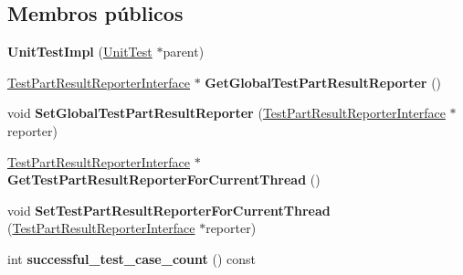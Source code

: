 \subsection*{Membros públicos}
\begin{DoxyCompactItemize}
\item 
\hypertarget{classtesting_1_1internal_1_1UnitTestImpl_a5fb75faa88ee71f26e16473455b70839}{{\bfseries Unit\-Test\-Impl} (\hyperlink{classtesting_1_1UnitTest}{Unit\-Test} $\ast$parent)}\label{classtesting_1_1internal_1_1UnitTestImpl_a5fb75faa88ee71f26e16473455b70839}

\item 
\hypertarget{classtesting_1_1internal_1_1UnitTestImpl_a1cd291fd6751654924362164735d4b49}{\hyperlink{classtesting_1_1TestPartResultReporterInterface}{Test\-Part\-Result\-Reporter\-Interface} $\ast$ {\bfseries Get\-Global\-Test\-Part\-Result\-Reporter} ()}\label{classtesting_1_1internal_1_1UnitTestImpl_a1cd291fd6751654924362164735d4b49}

\item 
\hypertarget{classtesting_1_1internal_1_1UnitTestImpl_a892b0e25b28af5e4400cf6fac336f2d8}{void {\bfseries Set\-Global\-Test\-Part\-Result\-Reporter} (\hyperlink{classtesting_1_1TestPartResultReporterInterface}{Test\-Part\-Result\-Reporter\-Interface} $\ast$reporter)}\label{classtesting_1_1internal_1_1UnitTestImpl_a892b0e25b28af5e4400cf6fac336f2d8}

\item 
\hypertarget{classtesting_1_1internal_1_1UnitTestImpl_a5fb3dd8bc839e10b62eba07790704132}{\hyperlink{classtesting_1_1TestPartResultReporterInterface}{Test\-Part\-Result\-Reporter\-Interface} $\ast$ {\bfseries Get\-Test\-Part\-Result\-Reporter\-For\-Current\-Thread} ()}\label{classtesting_1_1internal_1_1UnitTestImpl_a5fb3dd8bc839e10b62eba07790704132}

\item 
\hypertarget{classtesting_1_1internal_1_1UnitTestImpl_a1403fc10aebcc64479c5ee980c9b4eb4}{void {\bfseries Set\-Test\-Part\-Result\-Reporter\-For\-Current\-Thread} (\hyperlink{classtesting_1_1TestPartResultReporterInterface}{Test\-Part\-Result\-Reporter\-Interface} $\ast$reporter)}\label{classtesting_1_1internal_1_1UnitTestImpl_a1403fc10aebcc64479c5ee980c9b4eb4}

\item 
\hypertarget{classtesting_1_1internal_1_1UnitTestImpl_a549c383b4d21bfd4b60d3d6aa2ac1949}{int {\bfseries successful\-\_\-test\-\_\-case\-\_\-count} () const }\label{classtesting_1_1internal_1_1UnitTestImpl_a549c383b4d21bfd4b60d3d6aa2ac1949}


\end{DoxyCompactItemize}
